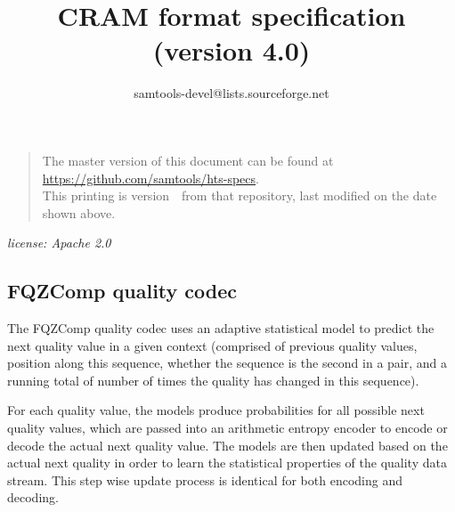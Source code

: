 \documentclass[a4paper]{article}
\begin{document}

\title{CRAM format specification (version 4.0)}
\author{samtools-devel@lists.sourceforge.net}
\date{\headdate}
\maketitle


\begin{quote}\small
The master version of this document can be found at
\url{https://github.com/samtools/hts-specs}.\\
This printing is version~\commitdesc\ from that repository,
last modified on the date shown above.
\end{quote}

\begin{center}
\textit{license: Apache 2.0}
\end{center}
\vspace*{1em}

\newlength{\maxwidth}
\newcommand{\algalign}[2] %
{\makebox[\maxwidth][l]{$#1{}$}${}#2$}

\makeatletter
\newcommand*{\bdiv}{%
  \nonscript\mskip-\medmuskip\mkern5mu%
  \mathbin{\operator@font div}\penalty900\mkern5mu%
  \nonscript\mskip-\medmuskip
}
\newcommand*{\bitand}{%
  \nonscript\mskip-\medmuskip\mkern5mu%
  \mathbin{\operator@font AND}\penalty900\mkern5mu%
  \nonscript\mskip-\medmuskip
}
\newcommand*{\bitor}{%
  \nonscript\mskip-\medmuskip\mkern5mu%
  \mathbin{\operator@font OR}\penalty900\mkern5mu%
  \nonscript\mskip-\medmuskip
}
\newcommand*{\bitxor}{%
  \nonscript\mskip-\medmuskip\mkern5mu%
  \mathbin{\operator@font XOR}\penalty900\mkern5mu%
  \nonscript\mskip-\medmuskip
}
\makeatother

\subsection*{FQZComp quality codec}

The FQZComp quality codec uses an adaptive statistical model to
predict the next quality value in a given context (comprised of
previous quality values, position along this sequence, whether the
sequence is the second in a pair, and a running total of number of
times the quality has changed in this sequence).

For each quality value, the models produce probabilities for all
possible next quality values, which are passed into an arithmetic
entropy encoder to encode or decode the actual next quality value.
The models are then updated based on the actual next quality in order
to learn the statistical properties of the quality data stream.  This
step wise update process is identical for both encoding and decoding.
\end{document}
